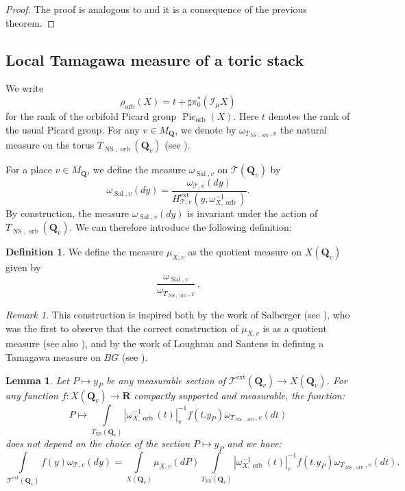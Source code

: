 \documentclass{proc-l}
\newcommand{\R}{\mathbf{R}}
\newcommand{\Q}{\mathbf{Q}}
\DeclareMathOperator{\Pic}{Pic}
\DeclareMathOperator{\NS}{NS}
\DeclareMathOperator{\orb}{orb}
\DeclareMathOperator{\ext}{ext}
\DeclareMathOperator{\Sal}{Sal}
\newcommand{\stackT}{\mathcal{T}}
\newcommand{\sheafI}{\mathcal{I}}
\newcommand{\w}{\omega}
\newcommand{\twistsector}{\pi_0^*(\sheafI_{\mu} X)}
\newtheorem{lemma}[theorem]{Lemma}
\theoremstyle{definition}
\newtheorem{definition}[theorem]{Definition}
\theoremstyle{remark}
\newtheorem{remark}[theorem]{Remark}
\numberwithin{equation}{section}
\begin{document}
\begin{proof}
    The proof is analogous to \cite[lemma 11.19]{salberger_torsor} and it is a consequence of the previous theorem.
\end{proof}





\subsection{Local Tamagawa measure of a toric stack}





We write $$\rho_{\orb}(X) = t + \sharp \twistsector$$ for the rank of the orbifold Picard group $\Pic_{\orb}(X)$. Here $t$ denotes the rank of the usual Picard group. For any $v \in M_{\Q}$, we denote by $\w_{T_{\NS,\orb},v}$ the natural measure on the torus $T_{\NS,\orb}(\Q_v)$ (see \cite[Definition 3.1.2]{peyre_zeta_height_function}). 

For a place $v \in M_{\Q}$, we define the measure $\w_{\Sal,v}$ on $\stackT(\Q_v)$ by
$$
\w_{\Sal,v}(dy) = \frac{\w_{\stackT,v}(dy)}{H^{\ext}_{\stackT,v}\left(y,\w_{X,\orb}^{-1}\right)}.
$$By construction, the measure $\w_{\Sal,v}(dy)$ is invariant under the action of $T_{\NS,\orb}(\Q_v)$. We can therefore introduce the following definition:

\begin{definition}\label{definition_quotient_measure_over_orbifold}
We define the measure $\mu_{X,v}$ as the quotient measure on $X(\Q_v)$ given by $$\frac{\w_{\Sal,v}}{\w_{T_{\NS,\orb},v}} \, .$$
\end{definition}

\begin{remark}
    This construction is inspired both by the work of Salberger (see \cite{salberger_torsor}), who was the first to observe that the correct construction of $\mu_{X,v}$ is as a quotient measure (see also \cite{peyre_zeta_height_function}), and by the work of Loughran and Santens in defining a Tamagawa measure on $BG$ (see \cite[Section 8]{loughran_santens_malle_conjecture}).
\end{remark}


\begin{lemma}\label{lemma_computation_integral_quotient}
    Let $P \mapsto y_P$ be any measurable section of $\stackT^{\ext}(\Q_v) \rightarrow X(\Q_v)$. For any function $f : X(\Q_v) \rightarrow \R$ compactly supported and measurable, the function:
    $$ P \longmapsto \int\limits_{T_{\NS}(\Q_v)} | \w_{X,\orb}^{-1}(t) |_{v}^{-1} f(t.y_P) \w_{T_{\NS,\orb},v}(dt)$$ does not depend on the choice of the section $P \mapsto y_P$ and we have:
    $$ \int\limits_{\stackT^{\ext}(\Q_v)} f(y) \w_{\stackT,v}(dy) = \int\limits_{X(\Q_v)} \mu_{X,v}(dP) \int\limits_{T_{\NS}(\Q_v)} | \w_{X,\orb}^{-1}(t) |_{v}^{-1} f(t.y_P) \w_{T_{\NS,\orb},v}(dt) .$$
\end{lemma}
\end{document}
